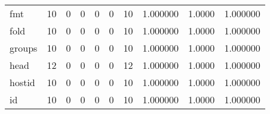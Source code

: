 \begin{longtable}{lrrrrrrrrr}
fmt       &                                       10 &                                                  0 &                                                  0 &                                                  0 &                                                  0 &                                                 10 &                                           1.000000 &                                 1.0000 &                             1.000000 \\
fold      &                                       10 &                                                  0 &                                                  0 &                                                  0 &                                                  0 &                                                 10 &                                           1.000000 &                                 1.0000 &                             1.000000 \\
groups    &                                       10 &                                                  0 &                                                  0 &                                                  0 &                                                  0 &                                                 10 &                                           1.000000 &                                 1.0000 &                             1.000000 \\
head      &                                       12 &                                                  0 &                                                  0 &                                                  0 &                                                  0 &                                                 12 &                                           1.000000 &                                 1.0000 &                             1.000000 \\
hostid    &                                       10 &                                                  0 &                                                  0 &                                                  0 &                                                  0 &                                                 10 &                                           1.000000 &                                 1.0000 &                             1.000000 \\
id        &                                       10 &                                                  0 &                                                  0 &                                                  0 &                                                  0 &                                                 10 &                                           1.000000 &                                 1.0000 &                             1.000000 \\

\end{longtable}

